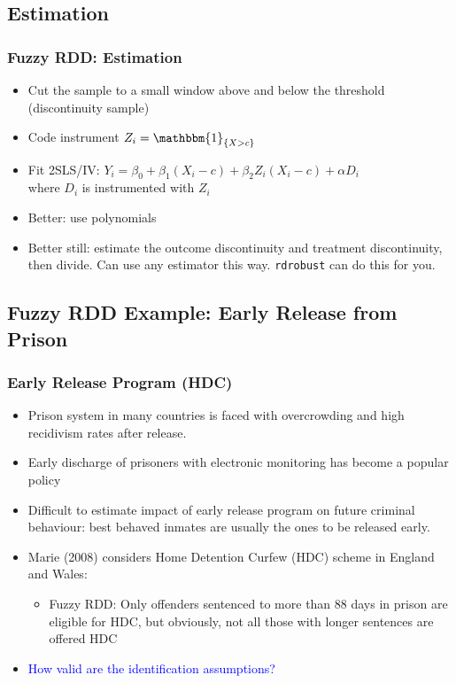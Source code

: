\documentclass[xcolor=dvipsnames]{beamer}
\begin{document}
\subsection{Estimation}

\begin{frame}
  \frametitle{Fuzzy RDD: Estimation}
  \small
  \begin{itemize}
  \item<1-> Cut the sample to a small window above and below the threshold (discontinuity sample)
  \smallskip
      \item<2-> Code instrument $Z_i=\mathbbm{1}_{\{X>c\}}$
      \smallskip
      \item<3-> Fit 2SLS/IV: $Y_i=\beta_0+\beta_1 (X_i-c) + \beta_2 Z_i (X_i-c) + \alpha D_i$\\
      where $D_i$ is instrumented with $Z_i$
      \smallskip
      \item<4-> Better: use polynomials 
      \item<5-> Better still:  estimate the outcome discontinuity and treatment discontinuity, then divide. Can use any estimator this way. \texttt{rdrobust} can do this for you.  
  \end{itemize}
\end{frame}

\subsection{Fuzzy RDD Example: Early Release from Prison}

\begin{frame}
  \frametitle{Early Release Program (HDC)}
  \begin{itemize}
  \item<1-> Prison system in many countries is faced with overcrowding and high recidivism rates after release.
  \item<2-> Early discharge of prisoners with electronic monitoring has become a popular policy
  \item<3-> Difficult to estimate impact of early release program on future criminal behaviour: best behaved inmates are usually the ones to be released early.
  \item<4-> Marie (2008) considers Home Detention Curfew (HDC) scheme in England and Wales:
  \begin{itemize}
    \item<5-> Fuzzy RDD: Only offenders sentenced to more than 88 days in prison are eligible for HDC, but obviously, not all those with longer sentences are offered HDC
  \end{itemize}
  \item<6-> \textcolor{Blue}{How valid are the identification assumptions?} 
  \end{itemize}
\end{frame}
\end{document}
